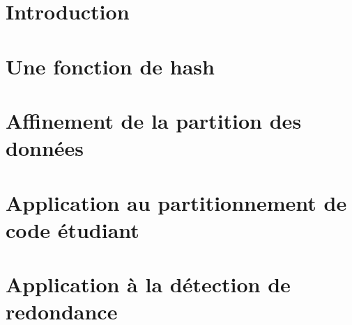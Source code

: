 \documentclass[a4paper]{easychair}
\title{}
\author{Alexandre Moine et Yann Régis-Gianas}
\institute{Université de Paris}
\begin{document}
\maketitle

\begin{abstract}

\end{abstract}

\section{Introduction}


\section{Une fonction de hash}
\label{sec:hash}


\section{Affinement de la partition des données}


\section{Application au partitionnement de code étudiant}
\label{sec:partition}


\section{Application à la détection de redondance}
\label{sec:redundancy}



\end{document}
